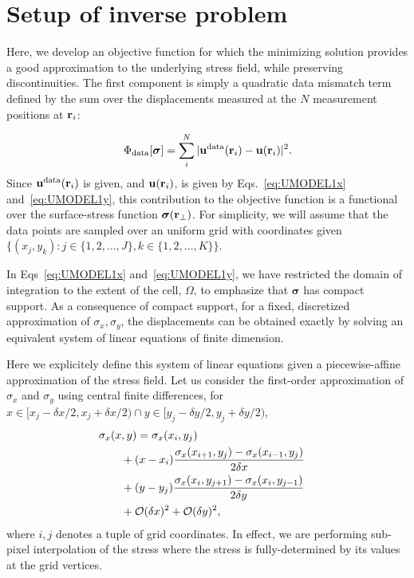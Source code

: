 \documentclass[aps,prl,reprint,twocolumn,groupedaddress,showpacs]{revtex4-1}
\def\r{{\bf r}}
\def\u{{\bf u}}
\newcommand{\bs}{\boldsymbol{\sigma}}
\begin{document}
%




\section{Setup of inverse problem}

Here, we develop an objective function for which the minimizing
solution provides a good approximation to the underlying stress
field, while preserving discontinuities.
 The first component is simply a quadratic data mismatch term
defined by the sum over the displacements measured at the $N$
measurement positions at $\r_{i}$:


\begin{equation}
\Phi_{\rm data}[\bs] = \sum_{i}^{N}\vert \u^{\rm
  data}(\r_{i})- \u(\r_i)\vert^{2}.
\end{equation}
%
Since $\u^{\rm data}(\r_{i})$ is given, and $\u(\r_{i})$, is given by
Eqs.~\ref{eq:UMODEL1x} and~\ref{eq:UMODEL1y}, this contribution to the objective function is a
functional over the surface-stress function $\bs(\r_{\perp})$.  For simplicity, we will assume that 
the data points are sampled over an uniform grid with coordinates given $\{ (x_j,y_k) : j\in\{1,2,\ldots,J\}, k\in\{1,2,\ldots,K\}\}.$

In Eqs~\ref{eq:UMODEL1x} and~\ref{eq:UMODEL1y}, we have restricted the domain of integration to the extent of the cell, $\Omega$, to emphasize that  $\boldsymbol\sigma$ has compact support. As a consequence of compact support, for a fixed, discretized approximation of $\sigma_{x},\sigma_{y}$, the displacements can be obtained exactly by solving an equivalent system of linear equations of finite dimension.

Here we explicitely define this system of linear equations given a piecewise-affine approximation of the stress field. Let us consider the first-order approximation of $\sigma_{x}$ and $\sigma_{y}$ using central finite differences, for $x\in[x_j - \delta x/2, x_j+\delta x/2) \cap y\in[y_j-\delta y/2, y_j + \delta y /2)$,
\begin{align}
\lefteqn{\sigma_{x}(x,y) =\sigma_{x}(x_i , y_j)  }\nonumber \\
& \qquad+ (x-x_i)\frac{\sigma_{x}(x_{i+1},y_j) -\sigma_{x}(x_{i-1},y_j) }{2\delta x}  \nonumber\\
&\qquad + (y-y_j)\frac{\sigma_{x}(x_i,y_{j+1}) - \sigma_{x}(x_i,y_{j-1}) }{2\delta y} \nonumber\\
&\qquad + \mathcal{O}(\delta x)^2 + \mathcal{O}(\delta y)^2,\label{eq:sigma_affine}
\end{align}
where $i,j$ denotes a tuple of grid coordinates. In effect, we are performing sub-pixel interpolation of the stress where the stress is fully-determined by its values at the grid vertices.
\end{document}
